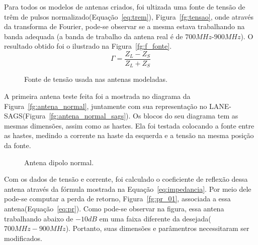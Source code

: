 Para todos os modelos de antenas criados, foi ultizada uma fonte de tensão de trêm de pulsos normalizado(Equação~\ref{eq:trem}), Figura~\ref{fg:tensao}, onde através da transforma de Fourier, pode-se observar se a mesma estava trabalhando na banda adequada (a banda de trabalho da antena real é de $700MHz$-$900MHz$). O resultado obtido foi o ilustrado na Figura~\ref{fg:f_fonte}.\\

\begin{equation}\label{eq:trem}
	\Gamma = \frac{Z_{L} - Z_{S}}{Z_{L} + Z_{S}}
\end{equation}

\begin{figure}[ht!]
	\begin{center}
\qquad
	\end{center}
	\caption{Fonte de tensão usada nas antenas modeladas.}
	\label{fg:fontes}
\end{figure}

A primeira antena teste feita foi a mostrada no diagrama da Figura~\ref{fg:antena_normal}, juntamente com sua representação no LANE-SAGS(Figura~\ref{fg:antena_normal_sags}). Os blocos do seu diagrama tem as mesmas dimensões, assim como as hastes. Ela foi testada colocando a fonte entre as hastes, medindo a corrente na haste da esquerda e a tensão na mesma posição da fonte. \\

\begin{figure}[ht!]
	\begin{center}
\qquad
	\end{center}
	\caption{Antena dipolo normal.}
	\label{fg:antena_normal_m}
\end{figure}

Com os dados de tensão e corrente, foi calculado o coeficiente de reflexão dessa antena através da fórmula mostrada na Equação~\ref{eq:impedancia}. Por meio dele pode-se computar a perda de retorno, Figura~\ref{fg:pr_01}, associada a essa antena(Equação~\ref{eq:pr}). Como pode-se observar na figura, essa antena trabalhando abaixo de $-10dB$ em uma faixa diferente da desejada($700MHz-900MHz$). Portanto, suas dimensões e parâmentros necessitaram ser modificados.\\

